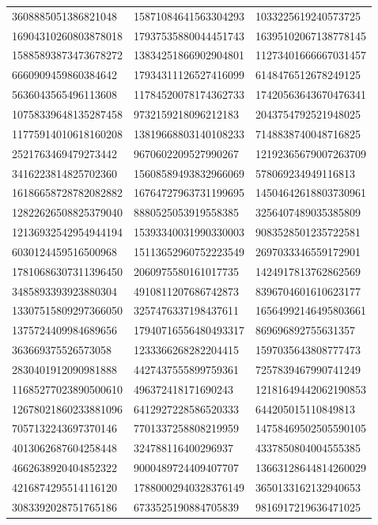 \begin{longtable}{*{3}{l}}
3608885051386821048&15871084641563304293&1033225619240573725\\
16904310260803878018&17937535880044451743&16395102067138778145\\
15885893873473678272&13834251866902904801&11273401666667031457\\
6660909459860384642&17934311126527416099&6148476512678249125\\
5636043565496113608&11784520078174362733&17420563643670476341\\
10758339648135287458&9732159218096212183&2043754792521948025\\
11775914010618160208&13819668803140108233&7148838740048716825\\
2521763469479273442&9670602209527990267&12192365679007263709\\
3416223814825702360&15608589493832966069&578069234949116813\\
16186658728782082882&16764727963731199695&14504642618803730961\\
12822626508825379040&8880525053919558385&3256407489035385809\\
12136932542954944194&15393340031990330003&9083528501235722581\\
6030124459516500968&15113652960752223549&2697033346559172901\\
17810686307311396450&2060975580161017735&1424917813762862569\\
3485893393923880304&4910811207686742873&8396704601610623177\\
13307515809297366050&3257476337198437611&16564992146495803661\\
1375724409984689656&17940716556480493317&869696892755631357\\
363669375526573058&1233366268282204415&1597035643808777473\\
2830401912090981888&4427437555899759361&7257839467990741249\\
11685277023890500610&496372418171690243&12181649442062190853\\
12678021860233881096&6412927228586520333&644205015110849813\\
7057132243697370146&7701337258808219959&14758469502505590105\\
4013062687604258448&324788116400296937&4337850804004555385\\
4662638920404852322&9000489724409407707&13663128644814260029\\
4216874295514116120&17880002940328376149&3650133162132940653\\
3083392028751765186&6733525190884705839&9816917219636471025\\

\end{longtable}
